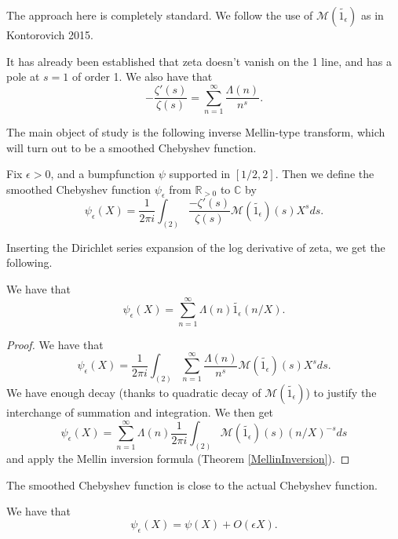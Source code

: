 
The approach here is completely standard. We follow the use of $\mathcal{M}(\widetilde{1_{\epsilon}})$ as in Kontorovich 2015.



It has already been established that zeta doesn't vanish on the 1 line, and has a pole at $s=1$ of order 1.
We also have that
$$
-\frac{\zeta'(s)}{\zeta(s)} = \sum_{n=1}^\infty \frac{\Lambda(n)}{n^s}.
$$

The main object of study is the following inverse Mellin-type transform, which will turn out to be a smoothed Chebyshev function.
\begin{definition}\label{SmoothedChebyshev}
Fix $\epsilon>0$, and a bumpfunction $\psi$ supported in $[1/2,2]$. Then we define the smoothed Chebyshev function $\psi_{\epsilon}$ from $\mathbb{R}_{>0}$ to $\mathbb{C}$ by
$$\psi_{\epsilon}(X) = \frac{1}{2\pi i}\int_{(2)}\frac{-\zeta'(s)}{\zeta(s)}
\mathcal{M}(\widetilde{1_{\epsilon}})(s)
X^{s}ds.$$
\end{definition}



Inserting the Dirichlet series expansion of the log derivative of zeta, we get the following.
\begin{theorem}\label{SmoothedChebyshevDirichlet}
We have that
$$\psi_{\epsilon}(X) = \sum_{n=1}^\infty \Lambda(n)\widetilde{1_{\epsilon}}(n/X).$$
\end{theorem}



\begin{proof}
We have that
$$\psi_{\epsilon}(X) = \frac{1}{2\pi i}\int_{(2)}\sum_{n=1}^\infty \frac{\Lambda(n)}{n^s}
\mathcal{M}(\widetilde{1_{\epsilon}})(s)
X^{s}ds.$$
We have enough decay (thanks to quadratic decay of $\mathcal{M}(\widetilde{1_{\epsilon}})$) to justify the interchange of summation and integration. We then get
$$\psi_{\epsilon}(X) =
\sum_{n=1}^\infty \Lambda(n)\frac{1}{2\pi i}\int_{(2)}
\mathcal{M}(\widetilde{1_{\epsilon}})(s)
(n/X)^{-s}
ds
$$
and apply the Mellin inversion formula (Theorem \ref{MellinInversion}).
\end{proof}



The smoothed Chebyshev function is close to the actual Chebyshev function.
\begin{theorem}\label{SmoothedChebyshevClose}
We have that
$$\psi_{\epsilon}(X) = \psi(X) + O(\epsilon X).$$
\end{theorem}



